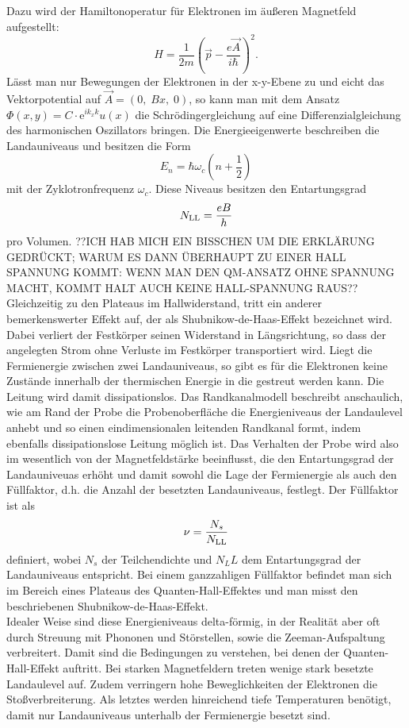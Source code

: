 \documentclass[paper=a4,fontsize=10pt,DIV=18,twocolumn,parskip=half]{scrartcl}
\numberwithin{equation}{section}    %
\begin{document}
Dazu wird der Hamiltonoperatur für Elektronen im äußeren Magnetfeld aufgestellt:
\begin{equation}
H=\frac{1}{2 m} (\vec{p} - \frac{e \vec{A}}{i \hbar})^2.
\end{equation}
Lässt man nur Bewegungen der Elektronen in der x-y-Ebene zu und eicht das Vektorpotential auf  $\vec{A}= (0, \; B x, \; 0)$, so kann man mit dem Ansatz $\Phi(x,y)=C \cdot \mathrm{e}^{i k_x k} u(x)$ die Schrödingergleichung auf eine Differenzialgleichung des harmonischen Oszillators bringen.
Die Energieeigenwerte beschreiben die Landauniveaus und besitzen die Form
\begin{equation}
E_n=\hbar \omega_c (n+\frac{1}{2})
\end{equation}
mit der Zyklotronfrequenz $\omega_c$. Diese Niveaus besitzen den Entartungsgrad
\begin{equation}
N_{\rm LL}= \frac{e B}{h}
\label{entartung}
\end{equation}
pro Volumen. ??ICH HAB MICH EIN BISSCHEN UM DIE ERKLÄRUNG GEDRÜCKT; WARUM ES DANN ÜBERHAUPT ZU EINER HALL SPANNUNG KOMMT: WENN MAN DEN QM-ANSATZ OHNE SPANNUNG MACHT, KOMMT HALT AUCH KEINE HALL-SPANNUNG RAUS?? \\
Gleichzeitig zu den Plateaus im Hallwiderstand, tritt ein anderer bemerkenswerter Effekt auf, der als Shubnikow-de-Haas-Effekt bezeichnet wird. Dabei verliert der Festkörper seinen Widerstand in Längsrichtung, so dass der angelegten Strom ohne Verluste im Festkörper transportiert wird. Liegt die Fermienergie zwischen zwei Landauniveaus, so gibt es für die Elektronen keine Zustände innerhalb der thermischen Energie in die gestreut werden kann. Die Leitung wird damit dissipationslos. Das Randkanalmodell beschreibt anschaulich, wie am Rand der Probe die Probenoberfläche die Energieniveaus der Landaulevel anhebt und so einen eindimensionalen leitenden Randkanal formt, indem ebenfalls dissipationslose Leitung möglich ist.
Das Verhalten der Probe wird also im wesentlich von der Magnetfeldstärke beeinflusst, die den Entartungsgrad der Landauniveuas erhöht und damit sowohl die Lage der Fermienergie als auch den Füllfaktor, d.h. die Anzahl der besetzten Landauniveaus, festlegt. Der Füllfaktor ist als
\begin{equation}
\nu=\frac{N_s}{N_{\rm LL}}
\label{fuellfaktor}
\end{equation}
definiert, wobei $N_s$ der Teilchendichte und $N_LL$ dem Entartungsgrad der Landauniveaus entspricht. Bei einem ganzzahligen Füllfaktor befindet man sich im Bereich eines Plateaus des Quanten-Hall-Effektes und man misst den beschriebenen Shubnikow-de-Haas-Effekt.\\
Idealer Weise sind diese Energieniveaus delta-förmig, in der Realität aber oft durch Streuung mit Phononen und Störstellen, sowie die Zeeman-Aufspaltung verbreitert. Damit sind die Bedingungen zu verstehen, bei denen der Quanten-Hall-Effekt auftritt. Bei starken Magnetfeldern treten wenige stark besetzte Landaulevel auf. Zudem verringern hohe Beweglichkeiten der Elektronen die Stoßverbreiterung. Als letztes werden hinreichend tiefe Temperaturen benötigt, damit nur Landauniveaus unterhalb der Fermienergie besetzt sind.\\
\end{document}
